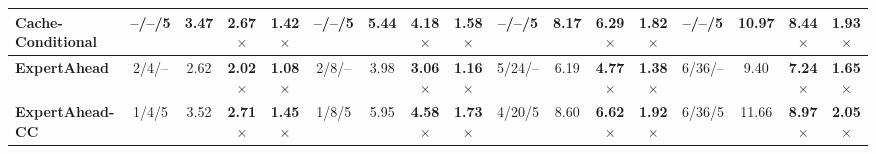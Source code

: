 \begin{table}[t]
{\begin{tabular}{lcccccccccccccccc}
Cache-Conditional~\cite{skliar2025mixturecacheconditionalexpertsefficient}
&
--/--/5 & 3.47 & 2.67$\times$ & 1.42$\times$
&
--/--/5 & 5.44 & 4.18$\times$ & 1.58$\times$
&
--/--/5 & 8.17 & 6.29$\times$ & 1.82$\times$
&
--/--/5 & 10.97 & 8.44$\times$ & 1.93$\times$
\\

\midrule

\textbf{ExpertAhead}
&
2/4/-- & 2.62 & \textbf{2.02$\times$} & \textbf{1.08$\times$}
&
2/8/-- & 3.98 & \textbf{3.06$\times$} & \textbf{1.16$\times$}
&
5/24/-- & 6.19 & \textbf{4.77$\times$} & \textbf{1.38$\times$}
&
6/36/-- & 9.40 & \textbf{7.24$\times$} & \textbf{1.65$\times$}
\\

\textbf{ExpertAhead-CC}
&
1/4/5 & 3.52 & \textbf{2.71$\times$} & \textbf{1.45$\times$}
&
1/8/5 & 5.95 & \textbf{4.58$\times$} & \textbf{1.73$\times$}
&
4/20/5 & 8.60 & \textbf{6.62$\times$} & \textbf{1.92$\times$}
&
6/36/5 & 11.66 & \textbf{8.97$\times$} & \textbf{2.05$\times$}
\\

\bottomrule
\end{tabular}
}
\end{table}
